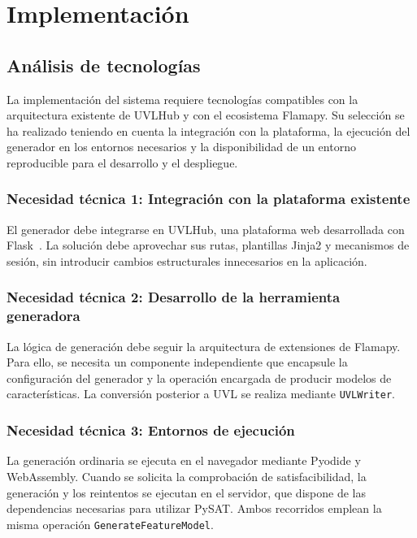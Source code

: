 \chapter{Implementación}
\label{chap:implementacion}

\section{Análisis de tecnologías}
\label{sec:analisis_tecnologias}

La implementación del sistema requiere tecnologías compatibles con la
arquitectura existente de UVLHub y con el ecosistema Flamapy. Su selección se ha
realizado teniendo en cuenta la integración con la plataforma, la ejecución del
generador en los entornos necesarios y la disponibilidad de un entorno
reproducible para el desarrollo y el despliegue.

\subsection*{Necesidad técnica 1: Integración con la plataforma existente}

El generador debe integrarse en UVLHub, una plataforma web desarrollada con
Flask~\cite{flask}. La solución debe aprovechar sus rutas, plantillas Jinja2 y
mecanismos de sesión, sin introducir cambios estructurales innecesarios en la
aplicación.

\subsection*{Necesidad técnica 2: Desarrollo de la herramienta generadora}

La lógica de generación debe seguir la arquitectura de extensiones de
Flamapy. Para ello, se necesita un componente independiente que encapsule la
configuración del generador y la operación encargada de producir modelos de
características. La conversión posterior a UVL se realiza mediante
\texttt{UVLWriter}.

\subsection*{Necesidad técnica 3: Entornos de ejecución}

La generación ordinaria se ejecuta en el navegador mediante Pyodide y
WebAssembly. Cuando se solicita la comprobación de satisfacibilidad, la
generación y los reintentos se ejecutan en el servidor, que dispone de las
dependencias necesarias para utilizar PySAT. Ambos recorridos emplean la misma
operación \texttt{GenerateFeatureModel}.

